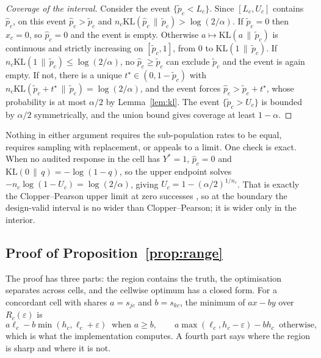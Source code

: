 \begin{proof}[Coverage of the interval]
Consider the event $\{\tilde p_c < L_c\}$. Since $[L_c, U_c]$ contains $\hat p_c$, on this event
$\hat p_c > \tilde p_c$ and $n_c \mathrm{KL}(\hat p_c \,\|\, \tilde p_c) > \log(2/\alpha)$. If
$\tilde p_c = 0$ then $x_c = 0$, so $\hat p_c = 0$ and the event is empty. Otherwise
$a \mapsto \mathrm{KL}(a \,\|\, \tilde p_c)$ is continuous and strictly increasing on
$[\tilde p_c, 1]$, from $0$ to $\mathrm{KL}(1 \,\|\, \tilde p_c)$. If
$n_c \mathrm{KL}(1 \,\|\, \tilde p_c) \le \log(2/\alpha)$, no $\hat p_c \ge \tilde p_c$ can exclude
$\tilde p_c$ and the event is again empty. If not, there is a unique $t^{\star} \in (0, 1 - \tilde p_c)$
with $n_c \mathrm{KL}(\tilde p_c + t^{\star} \,\|\, \tilde p_c) = \log(2/\alpha)$, and the event forces
$\hat p_c > \tilde p_c + t^{\star}$, whose probability is at most $\alpha/2$ by
Lemma~\ref{lem:kl}. The event $\{\tilde p_c > U_c\}$ is bounded by $\alpha/2$ symmetrically,
and the union bound gives coverage at least $1 - \alpha$.
\end{proof}

Nothing in either argument requires the sub-population rates to be equal, requires sampling
with replacement, or appeals to a limit. One check is exact. When no audited response in the
cell has $Y^* = 1$, $\hat p_c = 0$ and
$\mathrm{KL}(0 \,\|\, q) = -\log(1-q)$, so the upper endpoint solves
$-n_c\log(1 - U_c) = \log(2/\alpha)$, giving $U_c = 1 - (\alpha/2)^{1/n_c}$. That is exactly
the Clopper--Pearson upper limit at zero successes \citep{clopper1934use}, so at the boundary
the design-valid interval is no wider than Clopper--Pearson; it is wider only in the interior.

\subsection{Proof of Proposition~\ref{prop:range}}

The proof has three parts: the region contains the truth, the optimisation separates across
cells, and the cellwise optimum has a closed form. For a concordant cell with shares
$a = s_{jc}$ and $b = s_{kc}$, the minimum of $a x - b y$ over $R_c(\varepsilon)$ is
\begin{equation}
a\ell_c - b\min(h_c, \ell_c + \varepsilon) \ \text{ when } a \ge b, \qquad
a\max(\ell_c, h_c - \varepsilon) - b h_c \ \text{ otherwise},
\label{eq:closedform}
\end{equation}
which is what the implementation computes. A fourth part says where the region is sharp and
where it is not.

